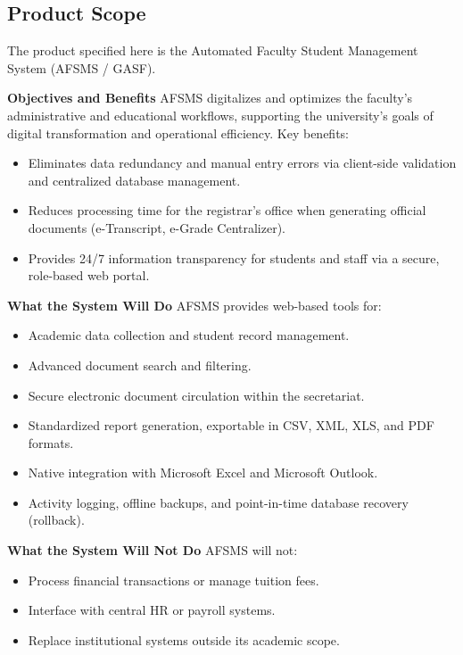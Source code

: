 \documentclass[11pt, a4paper]{article}
\begin{document}
\subsection{Product Scope}
The product specified here is the Automated Faculty Student Management System (AFSMS / GASF).

\textbf{Objectives and Benefits}
AFSMS digitalizes and optimizes the faculty's administrative and educational workflows, supporting the university's goals of digital transformation and operational efficiency. Key benefits:
\begin{itemize}
    \item Eliminates data redundancy and manual entry errors via client-side validation and centralized database management.
    \item Reduces processing time for the registrar's office when generating official documents (e-Transcript, e-Grade Centralizer).
    \item Provides 24/7 information transparency for students and staff via a secure, role-based web portal.
\end{itemize}

\textbf{What the System Will Do}
AFSMS provides web-based tools for:
\begin{itemize}
    \item Academic data collection and student record management.
    \item Advanced document search and filtering.
    \item Secure electronic document circulation within the secretariat.
    \item Standardized report generation, exportable in CSV, XML, XLS, and PDF formats.
    \item Native integration with Microsoft Excel and Microsoft Outlook.
    \item Activity logging, offline backups, and point-in-time database recovery (rollback).
\end{itemize}

\textbf{What the System Will Not Do}
AFSMS will not:
\begin{itemize}
    \item Process financial transactions or manage tuition fees.
    \item Interface with central HR or payroll systems.
    \item Replace institutional systems outside its academic scope.
\end{itemize}
\end{document}
